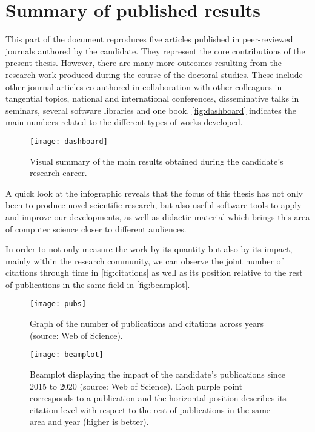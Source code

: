 \setchapterpreamble[u]{\margintoc}
\chapter{Summary of published results}
\label{ch:summary}

This part of the document reproduces five articles published in peer-reviewed journals authored by the candidate. They represent the core contributions of the present thesis. However, there are many more outcomes resulting from the research work produced during the course of the doctoral studies. These include other journal articles co-authored in collaboration with other colleagues in tangential topics, national and international conferences, disseminative talks in seminars, several software libraries and one book. \autoref{fig:dashboard} indicates the main numbers related to the different types of works developed.

\begin{figure*}[htbp]
    \texttt{[image: dashboard]}
    \caption{\label{fig:dashboard}Visual summary of the main results obtained during the candidate's research career.}
\end{figure*}

A quick look at the infographic reveals that the focus of this thesis has not only been to produce novel scientific research, but also useful software tools to apply and improve our developments, as well as didactic material which brings this area of computer science closer to different audiences.

In order to not only measure the work by its quantity but also by its impact, mainly within the research community, we can observe the joint number of citations through time in \autoref{fig:citations} as well as its position relative to the rest of publications in the same field in \autoref{fig:beamplot}.

\begin{figure}[htbp]
    \texttt{[image: pubs]}
    \caption{\label{fig:citations}Graph of the number of publications and citations across years (source: Web of Science).}
\end{figure}

\begin{figure}[h!]
    \texttt{[image: beamplot]}
    \caption{\label{fig:beamplot}Beamplot displaying the impact of the candidate's publications since 2015 to 2020 (source: Web of Science). Each purple point corresponds to a publication and the horizontal position describes its citation level with respect to the rest of publications in the same area and year (higher is better).}
\end{figure}

